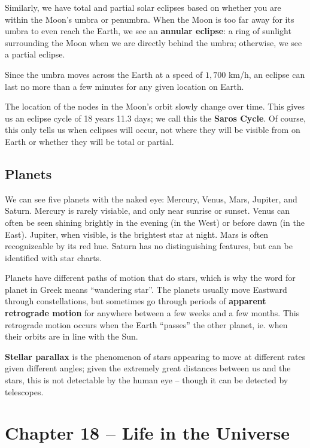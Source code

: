 \documentclass[12pt]{article}
\begin{document}
Similarly, we have total and partial solar eclipses based on whether you are within the Moon's umbra or penumbra. When the Moon is too far away for its umbra to even reach the Earth, we see an {\bf annular eclipse}: a ring of sunlight surrounding the Moon when we are directly behind the umbra; otherwise, we see a partial eclipse.

Since the umbra moves across the Earth at a speed of $1,700$ km/h, an eclipse can last no more than a few minutes for any given location on Earth.

The location of the nodes in the Moon's orbit slowly change over time. This gives us an eclipse cycle of 18 years 11.3 days; we call this the {\bf Saros Cycle}. Of course, this only tells us when eclipses will occur, not where they will be visible from on Earth or whether they will be total or partial.

\subsection{Planets}
We can see five planets with the naked eye: Mercury, Venus, Mars, Jupiter, and Saturn. Mercury is rarely visiable, and only near sunrise or sunset. Venus can often be seen shining brightly in the evening (in the West) or before dawn (in the East). Jupiter, when visible, is the brightest star at night. Mars is often recognizeable by its red hue. Saturn has no distinguishing features, but can be identified with star charts.

Planets have different paths of motion that do stars, which is why the word for planet in Greek means ``wandering star''. The planets usually move Eastward through constellations, but sometimes go through periods of {\bf apparent retrograde motion} for anywhere between a few weeks and a few months. This retrograde motion occurs when the Earth ``passes'' the other planet, ie. when their orbits are in line with the Sun.

{\bf Stellar parallax} is the phenomenon of stars appearing to move at different rates given different angles; given the extremely great distances between us and the stars, this is not detectable by the human eye -- though it can be detected by telescopes.



\section{Chapter 18 -- Life in the Universe}
\end{document}
